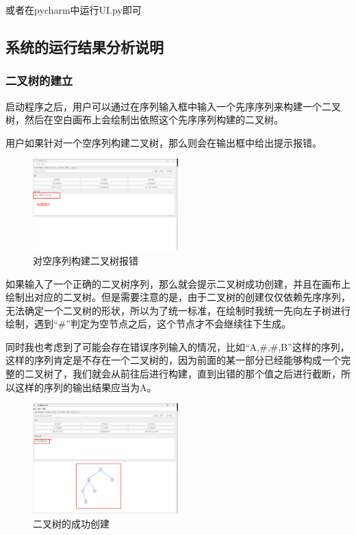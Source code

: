 \documentclass[12pt,a4paper]{article}
\begin{document}
或者在pycharm中运行UI.py即可

\subsection{系统的运行结果分析说明}
\subsubsection{二叉树的建立}
启动程序之后，用户可以通过在序列输入框中输入一个先序序列来构建一个二叉树，然后在空白画布上会绘制出依照这个先序序列构建的二叉树。

用户如果针对一个空序列构建二叉树，那么则会在输出框中给出提示报错。
\begin{figure}[H]
    \centering
    \includegraphics[width=0.5\textwidth]{pt1-4.png}
    \caption{对空序列构建二叉树报错}
\end{figure}

如果输入了一个正确的二叉树序列，那么就会提示二叉树成功创建，并且在画布上绘制出对应的二叉树。但是需要注意的是，由于二叉树的创建仅仅依赖先序序列，无法确定一个二叉树的形状，所以为了统一标准，在绘制时我统一先向左子树进行绘制，遇到“\#”判定为空节点之后，这个节点才不会继续往下生成。

同时我也考虑到了可能会存在错误序列输入的情况，比如“A,\#,\#,B”这样的序列，这样的序列肯定是不存在一个二叉树的，因为前面的某一部分已经能够构成一个完整的二叉树了，我们就会从前往后进行构建，直到出错的那个值之后进行截断，所以这样的序列的输出结果应当为A。

\begin{figure}[H]
    \centering
    \includegraphics[width=0.5\textwidth]{pt1-5.png}
    \caption{二叉树的成功创建}
\end{figure}
\end{document}
